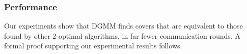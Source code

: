 

\subsubsection{Performance}
\label{ssb:algorithms-dgmm-performance}

Our experiments show that DGMM finds covers that are equivalent to those found by other 2-optimal algorithms, in far fewer communication rounds. A formal proof supporting our experimental results follows.



